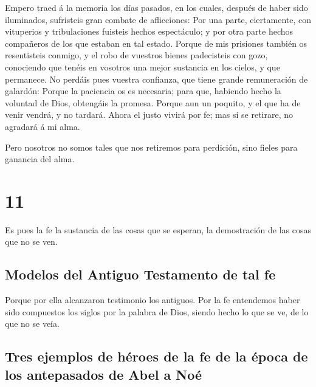  Empero traed á la memoria los días pasados, en los
cuales, después de haber sido iluminados, sufristeis gran combate de
aflicciones:  Por una parte, ciertamente, con vituperios
y tribulaciones fuisteis hechos espectáculo; y por otra parte hechos
compañeros de los que estaban en tal estado.  Porque de
mis prisiones también os resentisteis conmigo, y el robo de vuestros
bienes padecisteis con gozo, conociendo que tenéis en vosotros una mejor
sustancia en los cielos, y que permanece.  No perdáis
pues vuestra confianza, que tiene grande remuneración de galardón:
 Porque la paciencia os es necesaria; para que, habiendo
hecho la voluntad de Dios, obtengáis la promesa.  Porque
aun un poquito, y el que ha de venir vendrá, y no tardará.
 Ahora el justo vivirá por fe; mas si se retirare, no
agradará á mi alma.

 Pero nosotros no somos tales que nos retiremos para
perdición, sino fieles para ganancia del alma.

\hypertarget{section-10}{%
\section{11}\label{section-10}}

 Es pues la fe la sustancia de las cosas que se esperan,
la demostración de las cosas que no se ven.

\hypertarget{modelos-del-antiguo-testamento-de-tal-fe}{%
\subsection{Modelos del Antiguo Testamento de tal
fe}\label{modelos-del-antiguo-testamento-de-tal-fe}}

 Porque por ella alcanzaron testimonio los antiguos.
 Por la fe entendemos haber sido compuestos los siglos por
la palabra de Dios, siendo hecho lo que se ve, de lo que no se veía.

\hypertarget{tres-ejemplos-de-huxe9roes-de-la-fe-de-la-uxe9poca-de-los-antepasados-de-abel-a-nouxe9}{%
\subsection{Tres ejemplos de héroes de la fe de la época de los
antepasados \hspace{0pt}\hspace{0pt}de Abel a
Noé}\label{tres-ejemplos-de-huxe9roes-de-la-fe-de-la-uxe9poca-de-los-antepasados-de-abel-a-nouxe9}}

